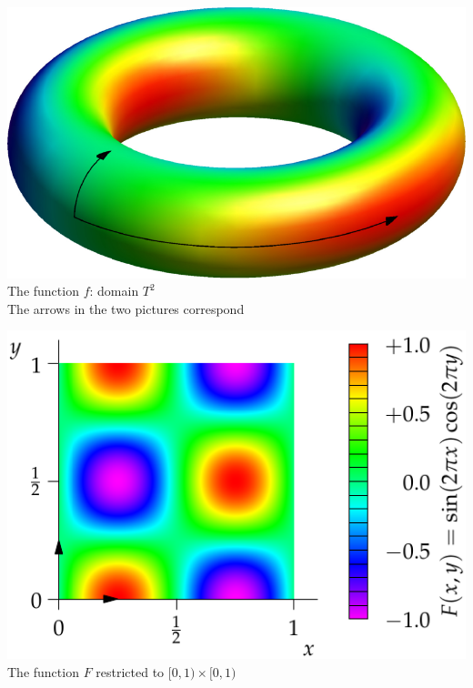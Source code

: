 
\begin{center}
\begin{minipage}{0.45\textwidth}\centering
\includegraphics[width=\textwidth]{relations-14-torus}\\[14pt]
The function $f$: domain $T^2$\\
The arrows in the two pictures correspond
\end{minipage}\qquad
\begin{minipage}{0.45\textwidth}\centering
\includegraphics[width=\textwidth]{relations-14-torus2}\\
The function $F$ restricted to $[0,1)\times [0,1)$
\end{minipage}
\end{center}

